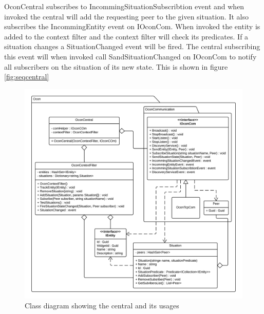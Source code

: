 \documentclass[../report.tex]{subfiles}
\begin{document}
OconCentral subscribes to IncommingSituationSubscribtion event and when invoked the central will add the requesting peer to the given situation. It also subscribes the IncommingEntity event on IOconCom. When invoked the entity is added to the context filter and the context filter will check its predicates. If a situation changes a SituationChanged event will be fired. The central subscribing this event will when invoked call SandSituationChanged on IOconCom to notify all subscribers on the situation of its new state. This is shown in figure \ref{fig:seqcentral}

\begin{figure}
\hspace{-70px}
\includegraphics[width=500px]{oconclassdiagram.png}
\caption{Class diagram showing the central and its usages}
\label{fig:oconclassdiagram}
\end{figure}
\end{document}
